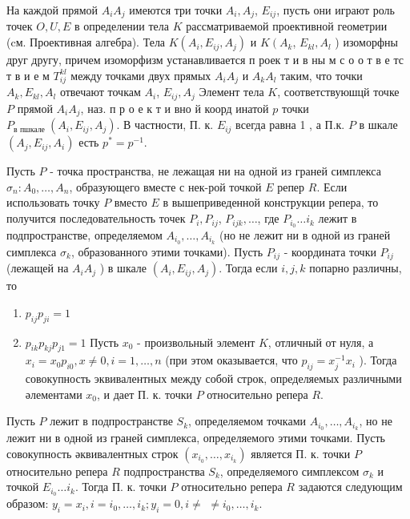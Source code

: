 \documentclass[10pt]{article}
\begin{document}
На каждой прямой $A_{i} A_{j}$ имеются три точки $A_{i}, A_{j}$, $E_{i j}$, пусть они играют роль точек $O, U, E$ в определении тела $K$ рассматриваемой проективной геометрии (cм. Проективная алгебра). Тела $K\left(A_{i}, E_{i j}, A_{j}\right)$ и $K\left(A_{k}\right.$, $E_{k l}, A_{l}$ ) изоморфны друг другу, причем изоморфизм устанавливается п роек т и в ны м с о о т в е тс т в и е м $T_{i j}^{k l}$ между точками двух прямых $A_{i} A_{j}$ и $A_{k} A_{l}$ таким, что точки $A_{k}, E_{k l}, A_{l}$ отвечают точкам $A_{i}$, $E_{i j}, A_{j}$ Элемент тела $K$, соответствуюшцй точке $P$ прямой $A_{i} A_{j}$, наз. п р о е к т и вно й коорд инатой $p$ точки $P_{\text {в пшкале }}\left(A_{i}, E_{i j}, A_{j}\right)$. В частности, П. к. $E_{i j}$ всегда равна 1 , а П.к. $P$ в шкале $\left(A_{j}, E_{i j}, A_{i}\right)$ есть $p^{*}=p^{-1}$.



Пусть $P$ - точка пространства, не лежащая ни на одной из граней симплекса $\sigma_{n}: A_{0}, \ldots, A_{n}$, образующего вместе с нек-рой точкой $E$ репер $R$. Если использовать точку $P$ вместо $E$ в вышеприведенной конструкции репера, то получится последовательность точек $P_{i}, P_{i j}$, $P_{i j k}, \ldots$, где $P_{i_{0}} \ldots i_{k}$ лежит в подпространстве, определяемом $A_{i_{0}}, \ldots, A_{i_{k}}$ (но не лежит ни в одной из граней симплекса $\sigma_{k}$, образованного этими точками). Пусть $P_{i j}$ - координата точки $P_{i j}$ (лежащей на $A_{i} A_{j}$ ) в шкале $\left(A_{i}, E_{i j}, A_{j}\right)$. Тогда если $i, j, k$ попарно различны, то



\begin{enumerate}

  \item $p_{i j} p_{j i}=1$



  \item $p_{i k} p_{k j} p_{j 1}=1$ Пусть $x_{0}$ - произвольный элемент $K$, отличный от нуля, а $x_{i}=x_{0} p_{i 0}, x \neq 0, i=1, \ldots, n$ (при этом оказывается, что $p_{i j}=x_{j}^{-1} x_{i}$ ). Тогда совокупность эквивалентных между собой строк, определяемых различными әлементами $x_{0}$, и дает П. к. точки $P$ относительно репера $R$.



\end{enumerate}



Пусть $P$ лежит в подпространстве $S_{k}$, определяемом точками $A_{i_{0}}, \ldots, A_{i_{k}}$, но не лежит ни в одной из граней симплекса, определяемого этими точками. Пусть совокупность әквивалентных строк $\left(x_{i_{0}}, \ldots, x_{i_{k}}\right)$ является П. к. точки $P$ относительно репера $R$ подпространства $S_{k}$, определяемого симплексом $\sigma_{k}$ и точкой $E_{i_{0}} \ldots i_{k}$. Тогда П. к. точки $P$ относительно репера $R$ задаются следующим образом: $y_{i}=x_{i}, i=i_{0}, \ldots, i_{k} ; y_{i}=0, i \neq$ $\neq i_{0}, \ldots, i_{k}$.
\end{document}
